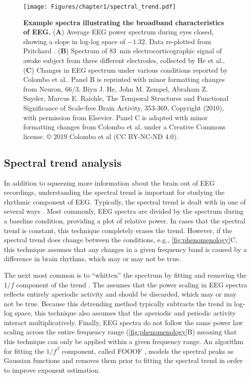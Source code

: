 \begin{figure}[t!]
    \centering
    \texttt{[image: Figures/chapter1/spectral\_trend.pdf]}
    
    \caption{\textbf{Example spectra illustrating the broadband characteristics of EEG.} 
    (\textbf{A}) Average EEG power spectrum during eyes closed, showing a slope in log-log space of $-1.32$. Data re-plotted from Pritchard \cite{Pritchard1992}. (\textbf{B}) Spectrum of \qty{83}{\minute} electrocorticographic signal of awake subject from three different electrodes, collected by He et al.\cite{He2010}.  (\textbf{C}) Changes in EEG spectrum under various conditions reported by Colombo et al.\cite{Colombo2019}. Panel B is reprinted with minor formatting changes from Neuron, 66/3, Biyu J. He, John M. Zempel, Abraham Z. Snyder, Marcus E. Raichle, The Temporal Structures and Functional Significance of Scale-free Brain Activity, 353-369, Copyright (2010), with permission from Elsevier. Panel C is adapted with minor formatting changes from Colombo et al. \cite{Colombo2019} under a Creative Commons license. © 2019 Colombo et al (CC BY-NC-ND 4.0).
    } 
    \label{fig:phenomenology}
\end{figure}

\subsection{Spectral trend analysis}
In addition to squeezing more information about the brain out of EEG recordings, understanding the spectral trend is important for studying the rhythmic component of EEG. Typically, the spectral trend is dealt with in one of several ways \cite{Gerster2022}. Most commonly, EEG spectra are divided by the spectrum during a baseline condition, providing a plot of relative power. In cases that the spectral trend is constant, this technique completely erases the trend. However, if the spectral trend does change between the conditions, e.g., \autoref{fig:phenomenology}C, this technique assumes that any changes in a given frequency band is caused by a difference in brain rhythms, which may or may not be true.

The next most common is to ``whitten'' the spectrum by fitting and removing the $1/f$ component of the trend \cite{Buzsaki2004,Buzsaki2006,Donoghue2020}. The assumes that the power scaling in EEG spectra reflects entirely aperiodic activity and should be discarded, which may or may not be true. Because this detrending method typically subtracts the trend in log-log space, this technique also assumes that the aperiodic and periodic activity interact multiplicatively. Finally, EEG spectra do not follow the same power law scaling across the entire frequency range (\autoref{fig:phenomenology}B) meaning that this technique can only be applied within a given frequency range. An algorithm for fitting the $1/f^\beta$ component, called FOOOF \cite{Donoghue2020}, models the spectral peaks as Gaussian functions and removes them prior to fitting the spectral trend in order to improve exponent estimation.

